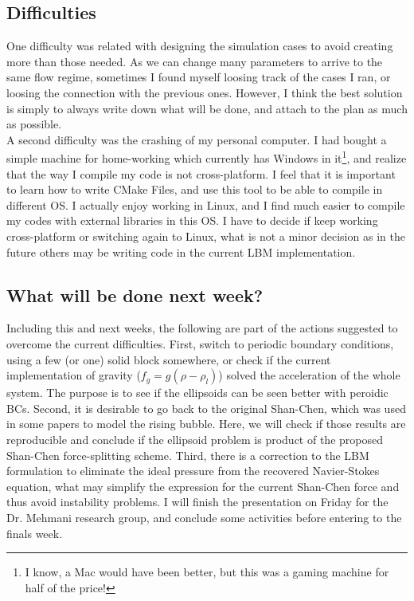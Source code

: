 \documentclass[12pt]{article}
\begin{document}
	\subsection*{Difficulties}
	One difficulty was related with designing the simulation cases to avoid creating more than those needed. As we can change many parameters to arrive to the same flow regime, sometimes I found myself loosing track of the cases I ran, or loosing the connection with the previous ones. However, I think the best solution is simply to always write down what will be done, and attach to the plan as much as possible.\\
	
	A second difficulty was the crashing of my personal computer. I had bought a simple machine for home-working which currently has Windows in it\footnote{I know, a Mac would have been better, but this was a gaming machine for half of the price!}, and realize that the way I compile my code is not cross-platform. I feel that it is important to learn how to write CMake Files, and use this tool to be able to compile in different OS. I actually enjoy working in Linux, and I find much easier to compile my codes with external libraries in this OS. I have to decide if keep working cross-platform or switching again to Linux, what is not a minor decision as in the future others may be writing code in the current LBM implementation. 
	
	\subsection*{What will be done next week?}
	Including this and next weeks, the following are part of the actions suggested to overcome the current difficulties. First, switch to periodic boundary conditions, using a few (or one) solid block somewhere, or check if the current implementation of gravity ($f_g = g (\rho - \rho_l)$) solved the acceleration of the whole system. The purpose is to see if the ellipsoids can be seen better with peroidic BCs. Second, it is desirable to go back to the original Shan-Chen, which was used in some papers to model the rising bubble. Here, we will check if those results are reproducible and conclude if the ellipsoid problem is product of the proposed Shan-Chen force-splitting scheme. Third, there is a correction to the LBM formulation to eliminate the ideal pressure from the recovered Navier-Stokes equation, what may simplify the expression for the current Shan-Chen force and thus avoid instability problems. I will finish the presentation on Friday for the Dr. Mehmani research group, and conclude some activities before entering to the finals week.
	
\end{document}
